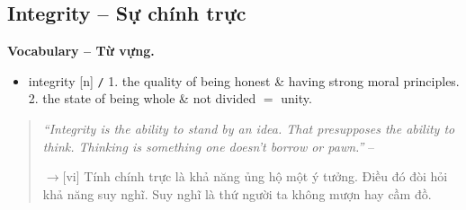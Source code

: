 \documentclass[12pt,oneside]{book}
\begin{document}
\subsection{Integrity -- Sự chính trực}
\textbf{\textsf{\small Vocabulary -- Từ vựng.}}
\begin{itemize}\small
	\item {\sf integrity} [n] {\tt/} 1. the quality of being honest \& having strong moral principles. 2. the state of being whole \& not divided $=$ {\sf unity}.
\end{itemize}

\begin{quotation}
	{\it``Integrity is the ability to stand by an idea. That presupposes the ability to think. Thinking is something one doesn't borrow or pawn.''} -- \cite{Rand_fountainhead}
	
	{\sf[en]$\to$[vi]} Tính chính trực là khả năng ủng hộ một ý tưởng. Điều đó đòi hỏi khả năng suy nghĩ. Suy nghĩ là thứ người ta không mượn hay cầm đồ.
\end{quotation}
\end{document}

